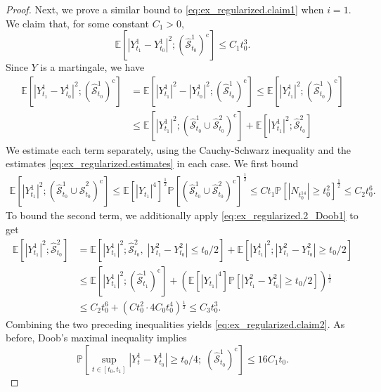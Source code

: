\documentclass[12pt,oneside]{amsart}
\theoremstyle{definition}
\newcommand{\Scc}{\hat{\mathcal S}}
\def\P{{\mathbb P}}
\def\E{{\mathbb E}}
\numberwithin{equation}{section}
\begin{document}
\begin{proof}
    Next, we prove a similar bound to \eqref{eq:ex_regularized.claim1} when $i = 1$. We claim that, for some constant $C_1 > 0$,
    \begin{equation}
        \label{eq:ex_regularized.claim2}
        \E[|Y_{t_1}^1 - Y_{t_0}^1|^2 ; (\Scc^1_{t_0})^\textrm{c}] \le C_1 t_0^3.
    \end{equation}
    Since $Y$ is a martingale, we have
    \begin{equation}
	    \begin{split}
	    	\E[|Y_{t_1}^1 - Y_{t_0}^1|^2 ; (\Scc^1_{t_0})^\textrm{c}] & = \E[|Y^1_{t_1}|^2 - |Y^1_{t_0}|^2;(\Scc^1_{t_0})^\textrm{c}] \leq \E[|Y^1_{t_1}|^2 ;(\Scc^1_{t_0})^\textrm{c}]\\
	    	& \leq \E[|Y^1_{t_1}|^2 ;(\Scc^1_{t_0} \cup \Scc^2_{t_0})^\textrm{c}] + \E[|Y^1_{t_1}|^2 ;\Scc^2_{t_0}]
	    \end{split}
    \end{equation}
    We estimate each term separately, using the Cauchy-Schwarz inequality and the estimates \eqref{eq:ex_regularized.estimates} in each case. We first bound
    \begin{align}
        \E[|Y_{t_1}^1|^2 ; (\Scc^1_{t_0} \cup \Scc^2_{t_0})^\textrm{c}]
        \le
        \E[|Y_{t_1}|^4]^\frac12 \P[ (\Scc^1_{t_0} \cup \Scc^2_{t_0})^\textrm{c} ]^\frac{1}{2} 
        \le C t_1 \P[ |N_{t^{14}_0}| \ge t_0^2]^\frac12 \le C_2 t_0^{6}.
    \end{align}
    To bound the second term, we additionally apply \eqref{eq:ex_regularized.2_Doob1} to get
    \begin{align}
        \E[|Y_{t_1}^1|^2 ;\Scc^2_{t_0} ]
        &=
        \E[|Y_{t_1}^1|^2 ;\Scc^2_{t_0}, \; |Y^2_{t_1} - Y^2_{t_0}| \le t_0 / 2 ] +
        \E[|Y_{t_1}^1|^2 ;|Y^2_{t_1} - Y^2_{t_0}| \ge t_0 / 2]
        \\
        &\le
        \E[|Y_{t_1}^1|^2 ;(\Scc^1_{t_1})^\textrm{c}] + \!\left( \E[ |Y_{t_1}|^4 ] \P[ |Y_{t_1}^2 - Y_{t_0}^2| \ge t_0 / 2] \right)\!^\frac12
        \\
        &\le
        C_2 t_0^6 + \!\left( C t_0^2 \cdot 4 C_0 t_0^4 \right)\!^\frac12 \le C_3 t_0^3.
    \end{align}   
    Combining the two preceding inequalities yields \eqref{eq:ex_regularized.claim2}.
   	As before, Doob's maximal inequality implies
    \begin{equation}
        \label{eq:ex_regularized.2_Doob2}
        \P[\sup_{t \in [t_0,t_1]} |Y_t^1 - Y_{t_0}^1| \ge t_0 / 4; \; (\Scc^1_{t_0})^\textrm{c}] \le 16 C_1 t_0.    
    \end{equation}
    

\end{proof}
\end{document}
